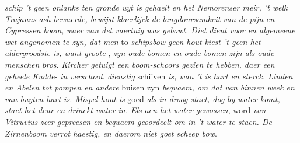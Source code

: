 \pstart {} \textit{schip}\protect{} \textit{'t geen onlanks ten gronde uyt is gehaelt en het Nemorenser meir, 't welk Trajanus}\protect{} \textit{ash bewaerde, bewijst klaerlijck de langdoursamkeit van de pijn}\protect{} \textit{en Cypressen boom}\protect{}, \textit{waer van det vaertuig was gebowt. Diet dient voor en algemeene wet angenomen te zyn, dat men} to  \textit{schipsbow}\protect{} \textit{geen hout}\protect{} \textit{kiest 't geen het aldergroodste is, want groote} , \textit{zyn oude bomen en oude bomen zijn als oude menschen}  \textit{bros}. 
\pend 
\pstart \textit{Kircher}\protect{} \textit{getuigt een boom-schoors gezien te hebben, daer een geheele Kudde}- \textit{in verschool}.
\pend 
\pstart {}\protect{}\protect{} \textit{dienstig}  schiiven \textit{is, wan 't is hart en sterck. Linden}\protect{} \textit{en Abelen}\protect{} \textit{tot pompen en andere} buisen zyn \textit{bequaem, om dat van binnen week en van buyten hart is. Mispel hout}\protect{} \textit{is} goed \textit{als}  \textit{in droog staet, dog}  \textit{by water komt, staet het deur en drinckt water in. Els}\protect{} \textit{aen het water gewossen}, word \textit{van Vitruvius}\protect{} \textit{zeer gepreesen en bequaem geoordeelt om in 't water te staen. De Zirnenboom}\protect{} \textit{verrot haestig, en daerom niet goet } \textit{scheep bow}\protect{}.
